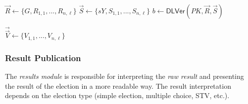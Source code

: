 \begin{algorithm}[ht]
    \DontPrintSemicolon
    \caption{$\mathsf{PartialDecryptionVer}(\vec{\vec{e}}, \vec{\vec{S}}, PK, sY)$}
    \label{alg: partial decryption ver}
    
    $\vec{R} \gets \{ G, R_{1, 1}, ..., R_{n, \ell} \}$ \;
    $\vec{S} \gets \{ sY, S_{1, 1}, ..., S_{n, \ell} \}$ \;
    $b \gets \mathsf{DLVer}(PK, \vec{R}, \vec{S})$ 
     
\end{algorithm}

\begin{algorithm}[ht]
    \DontPrintSemicolon
    \caption{$\mathsf{FinalizeDecryption} (\vec{\vec{e}}, \vec{\vec{\vec{S}}})$}
    \label{alg: finalize decryption}
    
    $\vec{\vec{V}} \gets \{ V_{1, 1}, ..., V_{n, \ell} \}$ \;
     
\end{algorithm}


\clearpage
\subsubsection{Result Publication} \label{sec: result publication}
The \textit{results module} is responsible for interpreting the \textit{raw result} and presenting the result of the election in a more readable way. The result interpretation depends on the election type (simple election, multiple choice, STV, etc.).

